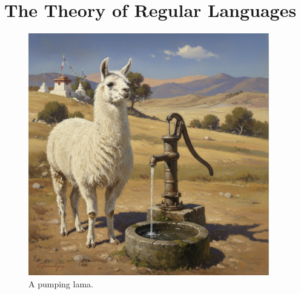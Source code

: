\chapter{The Theory of Regular Languages \label{chapter:regular-languages}}

\begin{figure}[h] 
\centering
  \includegraphics[width=10.5cm]{Abbildungen/pumping-lama.png}
\caption{A pumping lama.}
\label{fig:chapter-image}
\end{figure}

